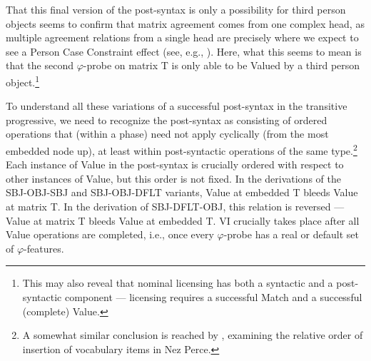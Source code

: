 \documentclass[output=paper
,modfonts
,nonflat]{langsci/langscibook}
\begin{document}

\noindent That this final version of the post-syntax is only a possibility for third person objects seems to confirm that matrix agreement comes from one complex head, as multiple agreement relations from a single head are precisely where we expect to see a Person Case Constraint effect (see, e.g., \citealt{Anagnostopoulou03,BejarRezac03,AdgerHarbour07,Rezac08,Rezac11}). Here, what this seems to mean is that the second $\varphi$-probe on matrix T is only able to be Valued by a third person object.\footnote{This may also reveal that nominal licensing has both a syntactic and a post-syntactic component --- licensing requires a successful Match and a successful (complete) Value.}

To understand all these variations of a successful post-syntax in the transitive progressive, we need to recognize the post-syntax as consisting of ordered operations that (within a phase) need not apply cyclically (from the most embedded node up), at least within post-syntactic operations of the same type.\footnote{A somewhat similar conclusion is reached by \citet{DealWolf17}, examining the relative order of insertion of vocabulary items in Nez Perce.} Each instance of Value in the post-syntax is crucially ordered with respect to other instances of Value, but this order is not fixed. In the derivations of the SBJ-OBJ-SBJ and SBJ-OBJ-DFLT variants, Value at embedded T bleeds Value at matrix T. In the derivation of SBJ-DFLT-OBJ, this relation is reversed --- Value at matrix T bleeds Value at embedded T. VI crucially takes place after all Value operations are completed, i.e., once every $\varphi$-probe has a real or default set of $\varphi$-features.
\end{document}
